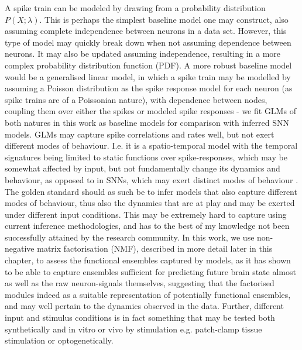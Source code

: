 \documentclass[mphil,deptreport,ianc]{infthesis} %
\begin{document}
A spike train can be modeled by drawing from a probability distribution $P(X; \lambda)$.
This is perhaps the simplest baseline model one may construct, also assuming complete independence between neurons in a data set.
However, this type of model may quickly break down when not assuming dependence between neurons.
It may also be updated assuming independence, resulting in a more complex probability distribution function (PDF).
A more robust baseline model would be a generalised linear model, in which a spike train may be modelled by assuming a Poisson distribution as the spike response model for each neuron (as spike trains are of a Poissonian nature), with dependence between nodes, coupling them over either the spikes or modeled spike responses - we fit GLMs of both natures in this work as baseline models for comparison with inferred SNN models.
GLMs may capture spike correlations and rates well, but not exert different modes of behaviour.
I.e. it is a spatio-temporal model with the temporal signatures being limited to static functions over spike-responses, which may be somewhat affected by input, but not fundamentally change its dynamics and behaviour, as opposed to in SNNs, which may exert distinct modes of behaviour \cite{Izhikevich2004}.
The golden standard should as such be to infer models that also capture different modes of behaviour, thus also the dynamics that are at play and may be exerted under different input conditions.
This may be extremely hard to capture using current inference methodologies, and has to the best of my knowledge not been successfully attained by the research community.
In this work, we use non-negative matrix factorisation (NMF), described in more detail later in this chapter, to assess the functional ensembles captured by models, as it has shown to be able to capture ensembles sufficient for predicting future brain state almost as well as the raw neuron-signals themselves, suggesting that the factorised modules indeed as a suitable representation of potentially functional ensembles, and may well pertain to the dynamics observed in the data.
Further, different input and stimulus conditions is in fact something that may be tested both synthetically and in vitro or vivo by stimulation e.g. patch-clamp tissue stimulation or optogenetically.


\end{document}
